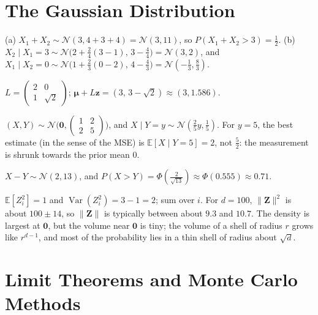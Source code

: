 \documentclass[11pt]{article}
\newcommand{\norm}[1]{\lVert #1 \rVert}
\newcommand{\E}{\mathbb{E}}
\DeclareMathOperator{\Var}{Var}
\begin{document}
\section*{The Gaussian Distribution}

\begin{description}[leftmargin=0pt, itemsep=0.3em]
    \item[\ref{pr:gauss-conditional}.] (a) $X_1 + X_2 \sim \mathcal{N}(3, 4 + 3 + 4) = \mathcal{N}(3, 11)$, so $P(X_1 + X_2 > 3) = \frac{1}{2}$. (b) $X_2 \mid X_1 = 3 \sim \mathcal{N}\big(2 + \frac{2}{4}(3 - 1), \, 3 - \frac{4}{4}\big) = \mathcal{N}(3, 2)$, and $X_1 \mid X_2 = 0 \sim \mathcal{N}\big(1 + \frac{2}{3}(0 - 2), \, 4 - \frac{4}{3}\big) = \mathcal{N}(-\frac{1}{3}, \frac{8}{3})$.
    \item[\ref{pr:cholesky}.] $L = \begin{pmatrix} 2 & 0 \\ 1 & \sqrt{2} \end{pmatrix}$; $\boldsymbol{\mu} + L\mathbf{z} = (3, \, 3 - \sqrt{2}) \approx (3, 1.586)$.
    \item[\ref{pr:denoising}.] $(X, Y) \sim \mathcal{N}\Big(\mathbf{0}, \begin{pmatrix} 1 & 2 \\ 2 & 5 \end{pmatrix}\Big)$, and $X \mid Y = y \sim \mathcal{N}(\frac{2}{5}y, \frac{1}{5})$. For $y = 5$, the best estimate (in the sense of the MSE) is $\E[X \mid Y = 5] = 2$, not $\frac{5}{2}$: the measurement is shrunk towards the prior mean $0$.
    \item[\ref{pr:gauss-difference}.] $X - Y \sim \mathcal{N}(2, 13)$, and $P(X > Y) = \Phi(\frac{2}{\sqrt{13}}) \approx \Phi(0.555) \approx 0.71$.
    \item[\ref{pr:gauss-shell}.] $\E[Z_i^2] = 1$ and $\Var(Z_i^2) = 3 - 1 = 2$; sum over $i$. For $d = 100$, $\norm{\mathbf{Z}}^2$ is about $100 \pm 14$, so $\norm{\mathbf{Z}}$ is typically between about $9.3$ and $10.7$. The density is largest at $\mathbf{0}$, but the volume near $\mathbf{0}$ is tiny; the volume of a shell of radius $r$ grows like $r^{d-1}$, and most of the probability lies in a thin shell of radius about $\sqrt{d}$.
\end{description}

\section*{Limit Theorems and Monte Carlo Methods}
\end{document}
